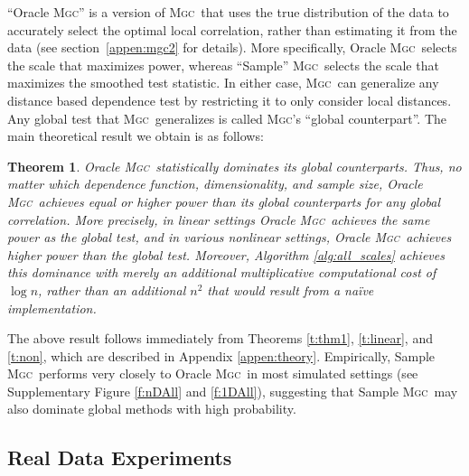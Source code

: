 \documentclass[11pt]{article}
\providecommand{\sct}[1]{{\normalfont\textsc{#1}}}
\newcommand{\Mgc}{\sct{Mgc}}
\newtheorem{thm}{Theorem}
\begin{document}
``Oracle \Mgc'' is a version of \Mgc~that uses the true distribution of the data to accurately select the optimal local correlation, rather than estimating it from the data (see section~\ref{appen:mgc2} for details). More specifically, Oracle \Mgc~selects the scale that maximizes power, whereas ``Sample'' \Mgc~selects the scale that maximizes the smoothed test statistic. 
In either case,  \Mgc~can generalize any distance based dependence test by restricting it to only consider local distances.  Any global test that \Mgc~generalizes is called \Mgc's ``global counterpart''.  The main theoretical result we obtain is as follows:
% 
\begin{thm} \label{t:dominate}
Oracle \Mgc~statistically dominates its global counterparts. Thus, no matter which 
dependence function, dimensionality, and sample size, 
Oracle \Mgc~achieves equal or higher power than its global counterparts for any global correlation.  More precisely, in \emph{linear} settings Oracle \Mgc~achieves the same power as the global test, and in various nonlinear settings, Oracle \Mgc~achieves {higher} power than the global test. Moreover, Algorithm \ref{alg:all_scales} achieves this dominance with merely an additional multiplicative computational cost of $\log n$, rather than an additional $n^2$ that would result from a na\"ive implementation.
\end{thm}

The above result follows immediately from Theorems \ref{t:thm1}, \ref{t:linear}, and \ref{t:non}, which are described in Appendix \ref{appen:theory}.   Empirically, Sample \Mgc~performs very closely to Oracle \Mgc~in most simulated settings (see Supplementary Figure \ref{f:nDAll} and \ref{f:1DAll}), suggesting that Sample \Mgc~may also dominate global methods with high probability.

\subsection*{Real Data Experiments}
\label{numer3}
\end{document}
